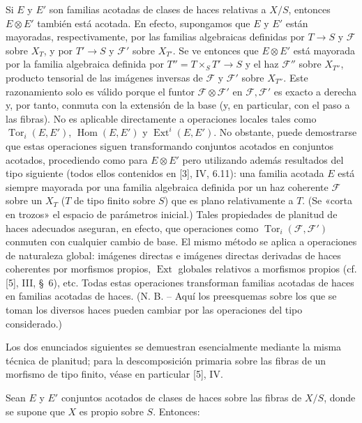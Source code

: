 Si $E$ y $E'$ son familias acotadas de clases de haces relativas a $X/S$,
entonces $E\otimes E'$ también está acotada. En efecto, supongamos que $E$ y
$E'$ están mayoradas, respectivamente, por las familias algebraicas definidas
por $T\longrightarrow S$ y $\mathcal F$ sobre $X_T$, y por
$T'\longrightarrow S$ y $\mathcal F'$ sobre $X_{T'}$. Se ve entonces que
$E\otimes E'$ está mayorada por la familia algebraica definida por
$T''=T\times_S T'\longrightarrow S$ y el haz $\mathcal F''$ sobre
$X_{T''}$, producto tensorial de las imágenes inversas de $\mathcal F$ y
$\mathcal F'$ sobre $X_{T''}$. Este razonamiento solo es válido porque el
funtor $\mathcal F\otimes\mathcal F'$ en $\mathcal F,\mathcal F'$ es exacto a
derecha y, por tanto, conmuta con la extensión de la base (y, en particular,
con el paso a las fibras). No es aplicable directamente a operaciones locales
tales como $\operatorname{Tor}_i(E,E')$, $\operatorname{Hom}(E,E')$ y
$\operatorname{Ext}^i(E,E')$. No obstante, puede demostrarse que estas
operaciones siguen transformando conjuntos acotados en conjuntos acotados,
procediendo como para $E\otimes E'$ pero utilizando además resultados del tipo
siguiente (todos ellos contenidos en [3], IV, 6.11): una familia acotada $E$
está siempre mayorada por una familia algebraica definida por un haz coherente
$\mathcal F$ sobre un $X_T$ ($T$ de tipo finito sobre $S$) que es plano
relativamente a $T$. (Se «corta en trozos» el espacio de parámetros inicial.)
Tales
propiedades de planitud de haces adecuados aseguran, en efecto, que operaciones
como $\operatorname{Tor}_i(\mathcal F,\mathcal F')$ conmuten con cualquier
cambio de base. El mismo método se aplica a operaciones de naturaleza global:
imágenes directas e imágenes directas derivadas de haces coherentes por
morfismos propios, $\operatorname{Ext}$ globales relativos a morfismos propios
(cf. [5], III, \S~6), etc. Todas estas operaciones transforman familias
acotadas de haces en familias acotadas de haces. (N. B. -- Aquí los
preesquemas sobre los que se toman los diversos haces pueden cambiar por las
operaciones del tipo considerado.)

Los dos enunciados siguientes se demuestran esencialmente mediante la misma
técnica de planitud; para la descomposición primaria sobre las fibras de un
morfismo de tipo finito, véase en particular [5], IV.

 Sean $E$ y $E'$ conjuntos acotados de clases de
haces sobre las fibras de $X/S$, donde se supone que $X$ es propio sobre $S$.
Entonces:

